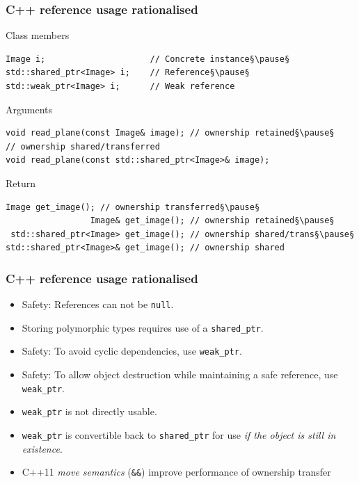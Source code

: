 \documentclass[handout]{beamer}
\begin{document}
\begin{frame}[fragile]
  \frametitle{C++ reference usage rationalised}
\begin{block}{Class members}
  \begin{lstlisting}[basicstyle=\scriptsize\ttfamily]
Image i;                     // Concrete instance§\pause§
std::shared_ptr<Image> i;    // Reference§\pause§
std::weak_ptr<Image> i;      // Weak reference
\end{lstlisting}
\pause
\end{block}
\begin{block}{Arguments}
  \begin{lstlisting}[basicstyle=\scriptsize\ttfamily]
void read_plane(const Image& image); // ownership retained§\pause§
// ownership shared/transferred
void read_plane(const std::shared_ptr<Image>& image);
\end{lstlisting}
\pause
\end{block}
\begin{block}{Return}
  \begin{lstlisting}[basicstyle=\scriptsize\ttfamily]
                  Image get_image(); // ownership transferred§\pause§
                 Image& get_image(); // ownership retained§\pause§
 std::shared_ptr<Image> get_image(); // ownership shared/trans§\pause§
std::shared_ptr<Image>& get_image(); // ownership shared
\end{lstlisting}
\end{block}
\end{frame}

\begin{frame}[fragile]
  \frametitle{C++ reference usage rationalised}
  \begin{itemize}
  \item<1-> Safety: References can not be \texttt{null}.
  \item<2-> Storing polymorphic types requires use of a
    \texttt{shared\_ptr}.
  \item<3-> Safety: To avoid cyclic dependencies, use \texttt{weak\_ptr}.
  \item<4-> Safety: To allow object destruction while maintaining a safe
    reference, use \texttt{weak\_ptr}.
  \item<5-> \texttt{weak\_ptr} is not directly usable.
  \item<5-> \texttt{weak\_ptr} is convertible back to \texttt{shared\_ptr}
    for use \emph{if the object is still in existence}.
  \item<6-> C++11 \emph{move semantics} (\texttt{\&\&}) improve
    performance of ownership transfer
  \end{itemize}
\end{frame}
\end{document}
